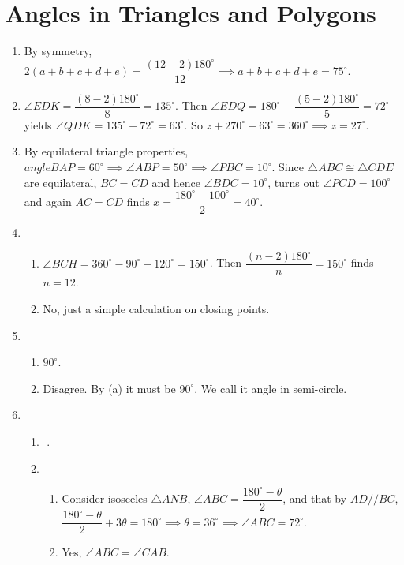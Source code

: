 \documentclass[12pt]{article}
\begin{document}
    \section{Angles in Triangles and Polygons}
    \begin{enumerate}
        \item By symmetry, $2(a+b+c+d+e)=\dfrac{(12-2)180^\circ}{12}\implies a+b+c+d+e = 75^\circ$.
        \item $\angle EDK = \dfrac{(8-2)180^\circ}{8} = 135^\circ$. Then $\angle EDQ = 180^\circ - \dfrac{(5-2)180^\circ}{5} = 72^\circ$ yields $\angle QDK = 135^\circ - 72^\circ = 63^\circ$. So $z+270^\circ+63^\circ = 360^\circ \implies z=27^\circ$.
        \item By equilateral triangle properties, $
        angle BAP = 60^\circ \implies \angle ABP = 50^\circ \implies \angle PBC = 10^\circ$. Since $\triangle ABC \cong \triangle CDE$ are equilateral, $BC=CD$ and hence $\angle BDC = 10^\circ$, turns out $\angle PCD = 100^\circ$ and again $AC=CD$ finds $x=\dfrac{180^\circ - 100^\circ}{2}=40^\circ$.
        \item \begin{enumerate}
            \item $\angle BCH = 360^\circ - 90^\circ - 120^\circ = 150^\circ$. Then $\dfrac{(n-2)180^\circ}{n}=150^\circ$ finds $n=12$.
            \item No, just a simple calculation on closing points.
        \end{enumerate}
        \item \begin{enumerate}
            \item $90^\circ$.
            \item Disagree. By (a) it must be $90^\circ$. We call it angle in semi-circle.
        \end{enumerate}
        \item \begin{enumerate}
            \item -.
            \item \begin{enumerate}
                \item Consider isosceles $\triangle ANB$, $\angle ABC = \dfrac{180^\circ -\theta}{2}$, and that by $AD//BC$, $\dfrac{180^\circ -\theta}{2} + 3\theta = 180^\circ \implies \theta = 36^\circ \implies \angle ABC = 72^\circ$.
                \item Yes, $\angle ABC = \angle CAB$.
            \end{enumerate}

\end{enumerate}
\end{enumerate}
\end{document}
